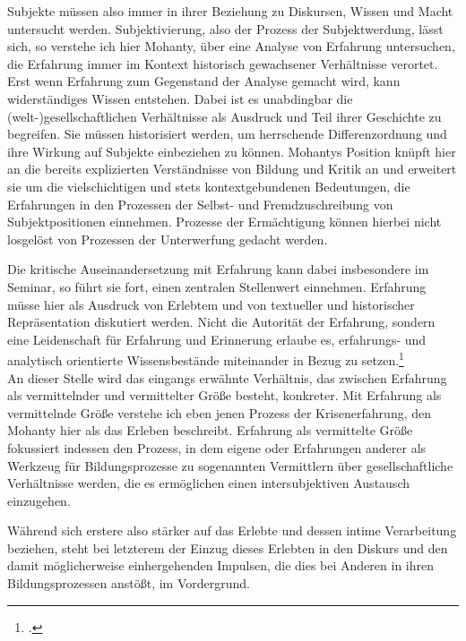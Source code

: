 Subjekte müssen also immer in ihrer Beziehung zu Diskursen, Wissen und Macht
untersucht werden. Subjektivierung, also der Prozess der Subjektwerdung, lässt
sich, so verstehe ich hier Mohanty, über eine Analyse von Erfahrung
untersuchen, die Erfahrung immer im Kontext historisch gewachsener Verhältnisse
verortet. \\
Erst wenn Erfahrung zum Gegenstand der Analyse gemacht wird, kann
widerständiges Wissen entstehen. Dabei ist es unabdingbar die
(welt-)gesellschaftlichen Verhältnisse als Ausdruck und Teil ihrer Geschichte
zu begreifen. Sie müssen historisiert werden, um herrschende Differenzordnung
und ihre Wirkung auf Subjekte einbeziehen zu können. Mohantys Position knüpft
hier an die bereits explizierten Verständnisse von Bildung und Kritik an und
erweitert sie um die vielschichtigen und stets kontextgebundenen Bedeutungen,
die Erfahrungen in den Prozessen der Selbst- und Fremdzuschreibung von
Subjektpositionen einnehmen. Prozesse der Ermächtigung können hierbei nicht
losgelöst von Prozessen der Unterwerfung gedacht werden. 

Die kritische Auseinandersetzung mit Erfahrung kann dabei insbesondere im
Seminar, so führt sie fort, einen zentralen Stellenwert einnehmen. Erfahrung
müsse hier als Ausdruck von Erlebtem und von textueller und historischer
Repräsentation diskutiert werden. Nicht die Autorität der Erfahrung, sondern
eine Leidenschaft für Erfahrung und Erinnerung erlaube es, erfahrungs- und
analytisch orientierte Wissensbestände miteinander in Bezug zu
setzen.\footnotemark\footcitetext{bellhooks}
\\

An dieser Stelle wird das eingangs erwähnte Verhältnis, das zwischen Erfahrung
als vermittelnder und vermittelter Größe besteht, konkreter. Mit Erfahrung als
vermittelnde Größe verstehe ich eben jenen Prozess der Krisenerfahrung, den
Mohanty hier als das Erleben beschreibt. Erfahrung als vermittelte Größe
fokussiert indessen den Prozess, in dem eigene oder Erfahrungen anderer als
Werkzeug für Bildungsprozesse zu sogenannten Vermittlern über gesellschaftliche
Verhältnisse werden, die es ermöglichen einen intersubjektiven Austausch
einzugehen. 

Während sich erstere also stärker auf das Erlebte und dessen intime
Verarbeitung beziehen, steht bei letzterem der Einzug dieses Erlebten in den
Diskurs und den damit möglicherweise einhergehenden Impulsen, die dies bei
Anderen in ihren Bildungsprozessen anstößt, im Vordergrund.\\

